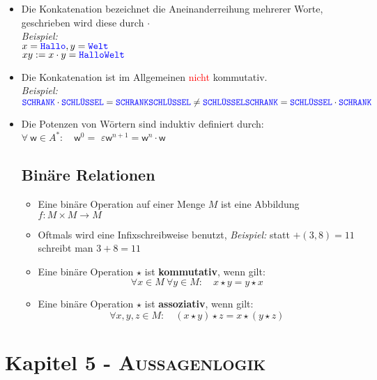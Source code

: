 \documentclass{article}
\newcommand{\leer}{$\varepsilon$}
\newcommand{\kapitel}[2]{Kapitel #1 - \textsc{#2}}
\newcommand{\blue}[1]{\textcolor{blue}{#1}}
\newcommand{\red}[1]{\textcolor{red}{#1}}
\newcommand{\strongColor}[1]{\textcolor{strongColor}{#1}}
\newcommand{\strong}[1]{\textbf{\strongColor{#1}}}
\newcommand{\important}[1]{\textcolor{importantColor}{#1}}
\newcommand{\example}[1]{\textit{Beispiel: }#1}
\newcommand{\word}[1]{\blue{\texttt{#1}}}
\newcommand{\w}{\textsf{w}}
\begin{document}
\begin{itemize}
    \item Die Konkatenation bezeichnet die Aneinanderreihung mehrerer Worte, geschrieben wird diese durch \strong{$\cdot$}\\
    \example\\ $x = \word{Hallo}, y = \word{Welt}$\\
    $xy:=x\cdot y = \word{HalloWelt}$
    \item Die Konkatenation ist im Allgemeinen \red{nicht} kommutativ.\\ \example\\ $\word{SCHRANK} \cdot \word{SCHLÜSSEL} = \word{SCHRANKSCHLÜSSEL} \neq \word{SCHLÜSSELSCHRANK} = \word{SCHLÜSSEL} \cdot \word{SCHRANK}$
    \item Die Potenzen von Wörtern sind induktiv definiert durch:\\
    $\forall \:\w \in A^*:\quad$$\w^0=$ \leer\qquad$\w^{n+1}=\w^n\cdot \w$
    
    \subsection{Binäre Relationen}
    \begin{itemize}
        \item Eine \important{binäre Operation} auf einer Menge $M$ ist eine Abbildung $f: M\times M \to M$
        \item Oftmals wird eine Infixschreibweise benutzt, \example statt $+(3,8)=11$ schreibt man $3+8=11$
        \item Eine binäre Operation $\star$ ist \strong{kommutativ}, wenn gilt:
        \[ \forall x \in M \:\forall y \in M: \quad x\star y = y \star x \]
        \item Eine binäre Operation $\star$ ist \strong{assoziativ}, wenn gilt:
        \[ \forall x,y,z \in M: \quad (x\star y)\star z = x \star (y \star z) \]
    \end{itemize}
\end{itemize}

\newpage

\section{\kapitel{5}{Aussagenlogik}}
\end{document}
